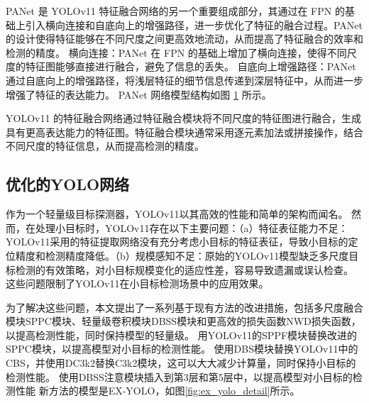 PANet 是 YOLOv11 特征融合网络的另一个重要组成部分，其通过在 FPN 的基础上引入横向连接和自底向上的增强路径，进一步优化了特征的融合过程。PANet 的设计使得特征能够在不同尺度之间更高效地流动，从而提高了特征融合的效率和检测的精度。
横向连接：PANet 在 FPN 的基础上增加了横向连接，使得不同尺度的特征图能够直接进行融合，避免了信息的丢失。
自底向上增强路径：PANet 通过自底向上的增强路径，将浅层特征的细节信息传递到深层特征中，从而进一步增强了特征的表达能力。
PANet 网络模型结构如图 \ref{fig:panet} 所示。
\begin{figure}[htb]
    \centering
    \captionsetup{font=footnotesize}
    \label{fig:panet}
\end{figure}

YOLOv11 的特征融合网络通过特征融合模块将不同尺度的特征图进行融合，生成具有更高表达能力的特征图。特征融合模块通常采用逐元素加法或拼接操作，结合不同尺度的特征信息，从而提高检测的精度。

\subsection{优化的YOLO网络}

作为一个轻量级目标探测器，YOLOv11以其高效的性能和简单的架构而闻名。 然而，在处理小目标时，YOLOv11存在以下主要问题：（a）特征表征能力不足：YOLOv11采用的特征提取网络没有充分考虑小目标的特征表征，导致小目标的定位精度和检测精度降低。（b）规模感知不足：原始的YOLOv11模型缺乏多尺度目标检测的有效策略，对小目标规模变化的适应性差，容易导致遗漏或误认检查。 这些问题限制了YOLOv11在小目标检测场景中的应用效果。 

为了解决这些问题，本文提出了一系列基于现有方法的改进措施，包括多尺度融合模块SPPC模块、轻量级卷积模块DBSS模块和更高效的损失函数NWD损失函数，以提高检测性能，同时保持模型的轻量级。
用YOLOv11的SPPF模块替换改进的SPPC模块，以提高模型对小目标的检测性能。
使用DBS模块替换YOLOv11中的CBS，并使用DC3k2替换C3k2模块，这可以大大减少计算量，同时保持小目标的检测性能。
使用DBSS注意模块插入到第3层和第5层中，以提高模型对小目标的检测性能 
新方法的模型是EX-YOLO，如图\ref{fig:ex_yolo_detail}所示。

